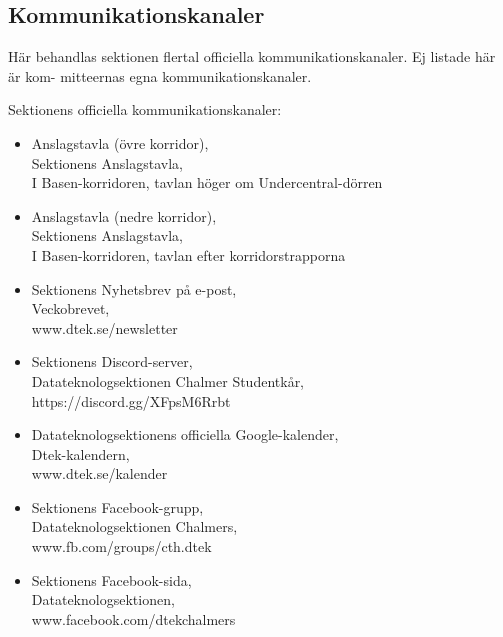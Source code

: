 \documentclass[a4paper]{dtek}
\begin{document}
\subsection{Kommunikationskanaler}
Här behandlas sektionen flertal officiella kommunikationskanaler. Ej listade här är kom-
mitteernas egna kommunikationskanaler.

Sektionens officiella kommunikationskanaler:
\begin{itemize}
    \item Anslagstavla (övre korridor),\\
    Sektionens Anslagstavla,\\
    I Basen-korridoren, tavlan höger om Undercentral-dörren

    \item Anslagstavla (nedre korridor),\\
    Sektionens Anslagstavla,\\
    I Basen-korridoren, tavlan efter korridorstrapporna

    \item Sektionens Nyhetsbrev på e-post,\\
    Veckobrevet,\\
    www.dtek.se/newsletter

    \item Sektionens Discord-server,\\
    Datateknologsektionen Chalmer Studentkår,\\
    https://discord.gg/XFpsM6Rrbt

    \item Datateknologsektionens officiella Google-kalender,\\
    Dtek-kalendern,\\
    www.dtek.se/kalender

    \item Sektionens Facebook-grupp,\\
    Datateknologsektionen Chalmers,\\
    www.fb.com/groups/cth.dtek

    \item Sektionens Facebook-sida,\\
    Datateknologsektionen,\\
    www.facebook.com/dtekchalmers

\end{itemize}
\end{document}
